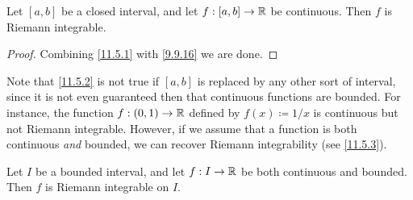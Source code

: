 \begin{cor}\label{11.5.2}
  Let \([a, b]\) be a closed interval, and let \(f : [a, b] \to \mathbb{R}\) be continuous.
  Then \(f\) is Riemann integrable.
\end{cor}

\begin{proof}
  Combining \cref{11.5.1} with \cref{9.9.16} we are done.
\end{proof}

\begin{note}
  Note that \cref{11.5.2} is not true if \([a, b]\) is replaced by any other sort of interval, since it is not even guaranteed then that continuous functions are bounded.
  For instance, the function \(f : (0, 1) \to \mathbb{R}\) defined by \(f(x) \coloneqq 1 / x\) is continuous but not Riemann integrable.
  However, if we assume that a function is both continuous \emph{and} bounded, we can recover Riemann integrability (see \cref{11.5.3}).
\end{note}

\begin{prop}\label{11.5.3}
  Let \(I\) be a bounded interval, and let \(f : I \to \mathbb{R}\) be both continuous and bounded.
  Then \(f\) is Riemann integrable on \(I\).
\end{prop}

